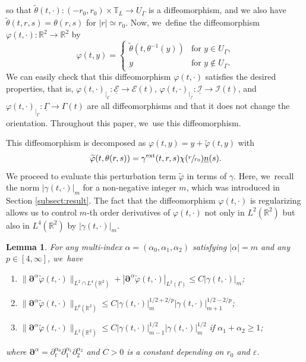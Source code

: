 \documentclass[10pt]{amsart}
\newenvironment{enumeratei}
{\bgroup\def\theenumi{\roman{enumi}}\def\theenumii{\arabic{enumii}}\begin{enumerate}}
{\end{enumerate}\egroup}
\newcommand{\R}{{\mathbb R}}
\newcommand{\dt}{\partial_t}
\newcommand{\cI}{{\mathcal I}}
\newcommand{\cE}{{\mathcal E}}
\newcommand{\ul}[1]{\underline{#1}}
\newcommand{\itGamma}{\mathit{\Gamma}}
\newtheorem{lemma}[theorem]{Lemma}
\theoremstyle{definition}
\begin{document}
so that $\tilde{\theta}(t,\cdot): (-r_0,r_0)\times\mathbb{T}_L \to U_{\ul{\itGamma}}$ is a diffeomorphism,
and we also have $\tilde{\theta}(t,r,s)=\theta(r,s)$ for $|r|\simeq r_0$.
Now, we~define the diffeomorphism $\varphi(t,\cdot) : \R^2 \to \R^2$ by
\begin{equation}\label{const phi}
\varphi(t,y) =
\begin{cases}
\tilde{\theta}(t,\theta^{-1}(y)) &\text{for } y \in U_{\ul{\itGamma}}, \\
y & \text{for } y \notin U_{\ul{\itGamma}}.
\end{cases}
\end{equation}
We can easily check that this diffeomorphism $\varphi(t,\cdot)$ satisfies the desired properties, that is,
$\varphi(t,\cdot)_{\vert_{\ul{\cE}}} : \ul{\cE}\to \cE(t)$, $\varphi(t,\cdot)_{\vert_{\ul{\cI}}} : \ul{\cI}\to \cI(t)$, and
$\varphi(t,\cdot)_{\vert_{\ul{\itGamma}}} : \ul{\itGamma}\to \itGamma(t)$ are all diffeomorphisms and that it does not change the orientation.
Throughout this paper, we~use this diffeomorphism.

This diffeomorphism is decomposed as $\varphi(t,y)=y+\widetilde{\varphi}(t,y)$ with
\[
\widetilde{\varphi}(t,\theta(r,s))=\gamma^{\rm ext}(t,r,s)\chi(\sfrac{r}{r_0})\ul{n}(s).
\]
We proceed to evaluate this perturbation term $\widetilde{\varphi}$ in terms of $\gamma$.
Here, we~recall the norm $|\gamma(t,\cdot)|_m$ for a non-negative integer $m$, which was introduced in Section \ref{subsect:result}.
The fact that the diffeomorphism $\varphi(t,\cdot)$ is regularizing allows us to control $m$-th order derivatives of $\varphi(t,\cdot)$
not only in $L^2(\R^2)$ but also in $L^4(\R^2)$ by $|\gamma(t,\cdot)|_m$.

\begin{lemma}\label{lem:EstDM}
For any multi-index $\alpha=(\alpha_0,\alpha_1,\alpha_2)$ satisfying $|\alpha|=m$ and any $p\in[4,\infty]$, we~have
\begin{enumeratei}
\item\label{lem:EstDMi}
$\|\bm{\partial}^\alpha\widetilde{\varphi}(t,\cdot)\|_{L^2\cap L^4(\R^2)} + |\bm{\partial}^\alpha\widetilde{\varphi}(t,\cdot)|_{L^2(\ul{\itGamma})}
\leq C|\gamma(t,\cdot)|_m$;
\item\label{lem:EstDMii}
$\|\bm{\partial}^\alpha\widetilde{\varphi}(t,\cdot)\|_{L^p(\R^2)}\leq C|\gamma(t,\cdot)|_m^{1/2+2/p}|\gamma(t,\cdot)|_{m+1}^{1/2-2/p}$;
\item\label{lem:EstDMiii}
$\|\bm{\partial}^\alpha\widetilde{\varphi}(t,\cdot)\|_{L^2(\R^2)}\leq C|\gamma(t,\cdot)|_{m-1}^{1/2}|\gamma(t,\cdot)|_m^{1/2}$ if $\alpha_1+\alpha_2\geq1$;
\end{enumeratei}
where $\bm{\partial}^\alpha=\dt^{\alpha_0}\partial_1^{\alpha_1}\partial_2^{\alpha_2}$ and $C>0$ is a constant depending on $r_0$ and $\varepsilon$.
\end{lemma}
\end{document}
